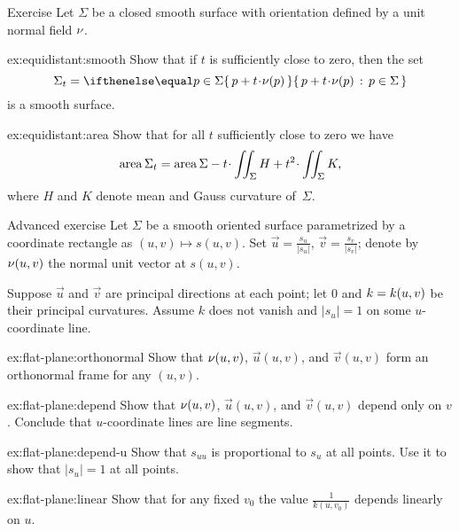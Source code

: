 \begin{thm}{Exercise}\label{ex:equidistant}
Let $\Sigma$ be a closed smooth surface with orientation defined by a unit normal field $\nu$.

\begin{subthm}{ex:equidistant:smooth}
Show that if $t$ is sufficiently close to zero, then the set 
\[\Sigma_t=\set{p+t\cdot \Norm(p)}{p\in\Sigma}\] 
is a smooth surface.
\end{subthm}

\begin{subthm}{ex:equidistant:area}
Show that for all $t$ sufficiently close to zero we have
\[\area\Sigma_t=\area\Sigma-t\cdot \iint_\Sigma H+t^2\cdot \iint_\Sigma K,\]
where $H$ and $K$ denote mean and Gauss curvature of~$\Sigma$.
\end{subthm}

\end{thm}

\begin{thm}{Advanced exercise}\label{ex:flat-plane}
Let $\Sigma$ be a smooth oriented surface parametrized by a coordinate rectangle as $(u,v)\mapsto s(u,v)$.
Set $\vec u=\tfrac{s_u}{|s_u|}$, $\vec v=\tfrac{s_v}{|s_v|}$;
denote by $\nu(u,v)$ the normal unit vector at $s(u,v)$.

Suppose $\vec u$ and $\vec v$ are principal directions at each point;
let $0$ and $k\z=k(u,v)$ be their principal curvatures.
Assume $k$ does not vanish and $|s_u|=1$ on some $u$-coordinate line.

\begin{subthm}{ex:flat-plane:orthonormal}
Show that $\nu(u,v)$, $\vec u(u,v)$, and $\vec v(u,v)$ form an orthonormal frame for any $(u,v)$.
\end{subthm}

\begin{subthm}{ex:flat-plane:depend}
Show that $\nu(u,v)$, $\vec u(u,v)$, and $\vec v(u,v)$ depend only on $v$.
Conclude that $u$-coordinate lines are line segments.
\end{subthm}

\begin{subthm}{ex:flat-plane:depend-u}
Show that $s_{uu}$ is proportional to $s_u$ at all points.
Use it to show that $|s_u|=1$ at all points.
\end{subthm}

\begin{subthm}{ex:flat-plane:linear}
Show that for any fixed $v_0$ the value $\tfrac1{k(u,v_0)}$ depends linearly on $u$.
\end{subthm}

\end{thm}

